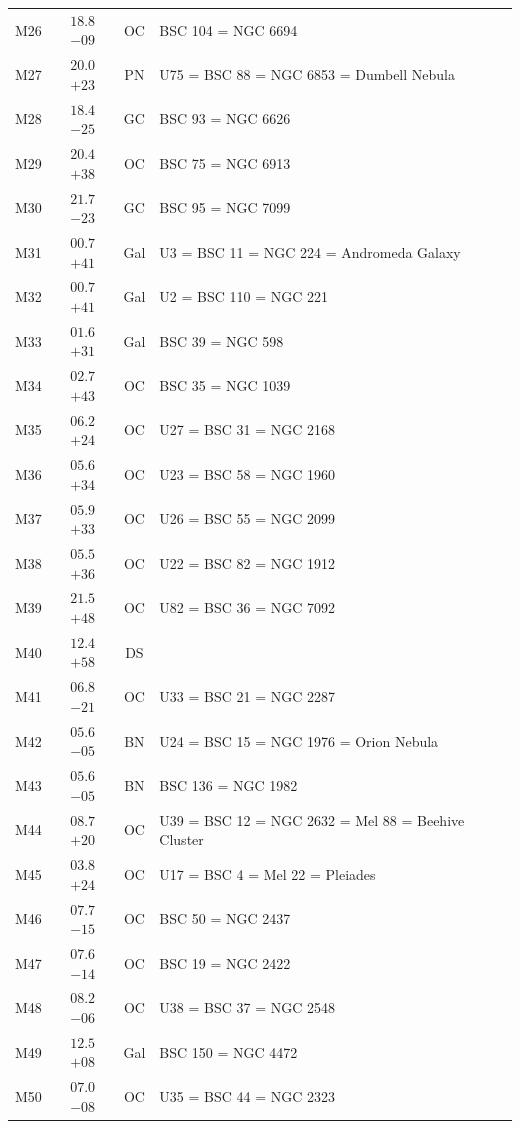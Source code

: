 \begin{table}[t]
\begin{tabularx}{\linewidth}{lccX}
M26  &$18.8$ $-09$&OC &BSC 104 = NGC 6694\\
M27  &$20.0$ $+23$&PN &U75 = BSC 88 = NGC 6853 = Dumbell Nebula\\
M28  &$18.4$ $-25$&GC &BSC 93 = NGC 6626\\
M29  &$20.4$ $+38$&OC &BSC 75 = NGC 6913\\
M30  &$21.7$ $-23$&GC &BSC 95 = NGC 7099\\
M31  &$00.7$ $+41$&Gal&U3 = BSC 11 = NGC 224 = Andromeda Galaxy\\
M32  &$00.7$ $+41$&Gal&U2 = BSC 110 = NGC 221\\
M33  &$01.6$ $+31$&Gal&BSC 39 = NGC 598\\
M34  &$02.7$ $+43$&OC &BSC 35 = NGC 1039\\
M35  &$06.2$ $+24$&OC &U27 = BSC 31 = NGC 2168\\
M36  &$05.6$ $+34$&OC &U23 = BSC 58 = NGC 1960\\
M37  &$05.9$ $+33$&OC &U26 = BSC 55 = NGC 2099\\
M38  &$05.5$ $+36$&OC &U22 = BSC 82 = NGC 1912\\
M39  &$21.5$ $+48$&OC &U82 = BSC 36 = NGC 7092\\
M40  &$12.4$ $+58$&DS &\\
M41  &$06.8$ $-21$&OC &U33 = BSC 21 = NGC 2287\\
M42  &$05.6$ $-05$&BN &U24 = BSC 15 = NGC 1976 = Orion Nebula\\
M43  &$05.6$ $-05$&BN &BSC 136 = NGC 1982\\
M44  &$08.7$ $+20$&OC &U39 = BSC 12 = NGC 2632 = Mel 88 = Beehive Cluster\\
M45  &$03.8$ $+24$&OC &U17 = BSC 4 = Mel 22 = Pleiades\\
M46  &$07.7$ $-15$&OC &BSC 50 = NGC 2437\\
M47  &$07.6$ $-14$&OC &BSC 19 = NGC 2422\\
M48  &$08.2$ $-06$&OC &U38 = BSC 37 = NGC 2548\\
M49  &$12.5$ $+08$&Gal&BSC 150 = NGC 4472\\
M50  &$07.0$ $-08$&OC &U35 = BSC 44 = NGC 2323\\

        \hline
    \end{tabularx}
\end{table}
\clearpage



